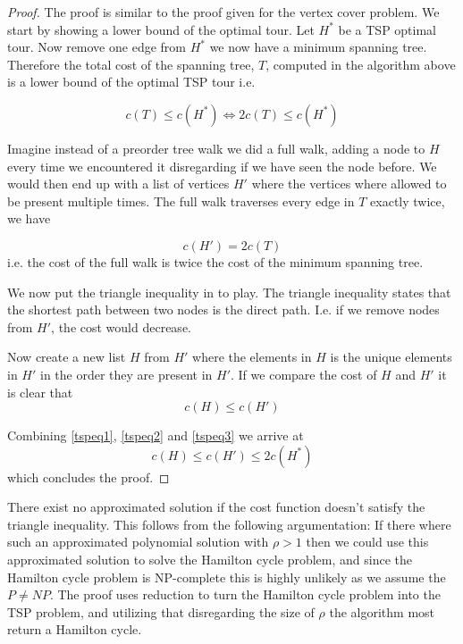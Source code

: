 \documentclass[10pt]{article}
\begin{document}
\begin{proof}
The proof is similar to the proof given for the vertex cover problem. We start by showing a lower bound of the optimal tour. Let $H^*$ be a TSP optimal tour. Now remove one edge from $H^*$ we now have a minimum spanning tree. Therefore the total cost of the spanning tree, $T$, computed in the algorithm above is a lower bound of the optimal TSP tour i.e.

\begin{equation}
  c(T) \leq c(H^*) \Leftrightarrow 2c(T) \leq c(H^*) \label{tspeq1}
\end{equation}

Imagine instead of a preorder tree walk we did a full walk, adding a node to $H$ every time we encountered it disregarding if we have seen the node before. We would then end up with a list of vertices $H'$ where the vertices where allowed to be present multiple times. The full walk traverses every edge in $T$ exactly twice, we have

\begin{equation}
  c(H') = 2 c(T) \label{tspeq2}
\end{equation}
i.e. the cost of the full walk is twice the cost of the minimum spanning tree. 

We now put the triangle inequality in to play. The triangle inequality states that the shortest path between two nodes is the direct path. I.e. if we remove nodes from $H'$, the cost would decrease. 

Now create a new list $H$ from $H'$ where the elements in $H$ is the unique elements in $H'$ in the order they are present in $H'$. If we compare the cost of $H$ and $H'$ it is clear that 
\begin{equation}
  c(H) \leq c(H') \label{tspeq3}
\end{equation}

Combining \ref{tspeq1}, \ref{tspeq2} and \ref{tspeq3} we arrive at
\begin{equation}
  c(H) \leq c(H') \leq 2c(H^*)  
\end{equation}
which concludes the proof.

\end{proof}

There exist no approximated solution if the cost function doesn't satisfy the triangle inequality. This follows from the following argumentation: If there where such an approximated polynomial solution with $\rho>1$ then we could use this approximated solution to solve the Hamilton cycle problem, and since the Hamilton cycle problem is NP-complete this is highly unlikely as we assume the $P \neq NP$. The proof uses reduction to turn the Hamilton cycle problem into the TSP problem, and utilizing that disregarding the size of $\rho$ the algorithm most return a Hamilton cycle.
\end{document}
